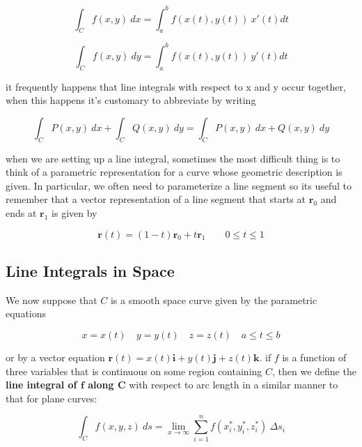 \documentclass{article}
\begin{document}
\begin{equation*}
    \int_C f(x,y) \ dx = \int^b_a f(x(t), y(t)) \ x'(t) dt 
\end{equation*}

\begin{equation*}
    \int_C f(x,y) \ dy = \int^b_a f(x(t), y(t)) \ y'(t) dt
\end{equation*}

it frequently happens that line integrals with respect to x and y occur together, when this happens it's customary to abbreviate by writing 

\begin{equation*}
    \int_C P(x,y) \ dx + \int_C Q(x,y) \ dy = \int_C P(x,y) \ dx + Q(x,y) \ dy
\end{equation*}

when we are setting up a line integral, sometimes the most difficult thing is to think of a parametric representation for a curve whose geometric description is given. In particular, we often need to parameterize a line segment so its useful to remember that a vector representation of a line segment that starts at $\mathbf{r}_0$ and ends at $\mathbf{r}_1$ is given by 

\begin{equation*}
    \mathbf{r}(t) = (1- t) \mathbf{r}_0 + t\mathbf{r}_1 \qquad 0 \leq t \leq 1
\end{equation*}

\subsection{Line Integrals in Space}

We now suppose that $C$ is a smooth space curve given by the parametric equations 

\begin{equation*}
    x = x(t) \quad y = y(t) \quad z = z(t) \quad a \leq t \leq b
\end{equation*}

or by a vector equation $\mathbf{r}(t) = x(t) \mathbf{i} + y(t) \mathbf{j} + z(t) \mathbf{k}$. if $f$ is a function of three variables that is continuous on some region containing $C$, then we define the \textbf{ line integral of $\mathbf{f}$ along $\mathbf{C}$} with respect to arc length in a similar manner to that for plane curves:

\begin{equation*}
    \int_C f(x,y,z) \ ds = \lim_{x \rightarrow \infty} \sum_{i=1}^{n} f(x_i^*, y_i^*, z_i^*) \ \Delta s_i
\end{equation*}
\end{document}
